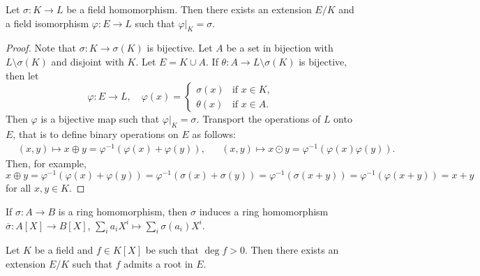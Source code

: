 
\begin{lemma}
\label{lem:exists_bijective}
	Let $\sigma\colon K\to L$ be a field homomorphism. Then there exists an extension
	$E/K$ and a field isomorphism $\varphi\colon E\to L$
	such that $\varphi|_K=\sigma$. 
\end{lemma}

\begin{proof}
    Note that $\sigma\colon K\to\sigma(K)$ is bijective. 
    Let $A$ be a set in bijection with $L\setminus\sigma(K)$ and disjoint with $K$. 
	Let $E=K\cup A$. If $\theta\colon A\to L\setminus\sigma(K)$ is bijective, then 
	let 
	\[
		\varphi\colon E\to L,
		\quad
		\varphi(x)=\begin{cases}
			\sigma(x) & \text{if $x\in K$},\\
			\theta(x) & \text{if $x\in A$}.
		\end{cases}
	\]
	Then $\varphi$ is a bijective map such that $\varphi|_K=\sigma$. 
	Transport the operations of $L$ onto $E$, that is 
	to define binary operations on $E$ as follows: 
	\begin{align*}
		&(x,y)\mapsto x\oplus y=\varphi^{-1}(\varphi(x)+\varphi(y)), && 
		(x,y)\mapsto x\odot y=\varphi^{-1}(\varphi(x)\varphi(y)).
	\end{align*}
	Then, for example, 
	\[
		x\oplus y=\varphi^{-1}(\varphi(x)+\varphi(y))=\varphi^{-1}(\sigma(x)+\sigma(y))
		=\varphi^{-1}(\sigma(x+y))=\varphi^{-1}(\varphi(x+y))=x+y
	\]
	for all $x,y\in K$. 
\end{proof}

If $\sigma\colon A\to B$ is a ring homomorphism, then $\sigma$ induces a ring
homomorphism $\overline{\sigma}\colon A[X]\to B[X]$,
$\sum_ia_iX^i\mapsto\sum_i\sigma(a_i)X^i$. 

\begin{theorem}
	Let $K$ be a field and $f\in K[X]$ be such that $\deg f>0$. Then 
	there exists an extension $E/K$ such that $f$ admits a root in $E$. 
\end{theorem}


